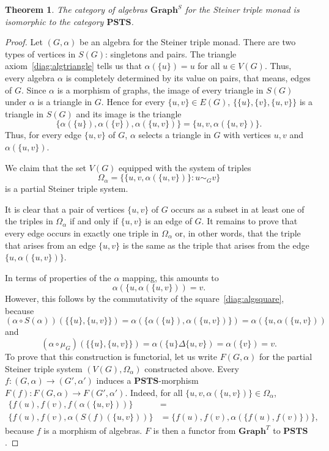 \documentclass[reqno,A4paper]{amsart}
\newcommand{\PSTS}{\mathbf{PSTS}}
\newcommand{\Graph}{\mathbf{Graph}}
\newtheorem{theorem}{Theorem}[section]
\theoremstyle{definition}
\numberwithin{equation}{section}
\begin{document}
\begin{theorem}
The category of algebras $\Graph^S$ for the Steiner triple monad is isomorphic to the category
$\PSTS$.
\end{theorem}
\begin{proof}
Let $(G,\alpha)$ be an algebra for the Steiner triple monad. 
There are two types of vertices in $S(G)$: singletons and pairs. The triangle
axiom~\eqref{diag:algtriangle} tells us that $\alpha(\{u\})=u$ for all $u\in V(G)$.
Thus, every algebra $\alpha$ is completely determined by its value on pairs, that means, edges of $G$.
Since $\alpha$ is a morphism of graphs, the image of every triangle in $S(G)$ under $\alpha$ is a triangle
in $G$. Hence for every $\{u,v\}\in E(G)$, $\{\{u\},\{v\},\{u,v\}\}$ is a triangle in
$S(G)$ and its image is the triangle
$$
\{\alpha(\{u\}),\alpha(\{v\}),\alpha(\{u,v\})\}=\{u,v,\alpha(\{u,v\})\}.
$$
Thus, for every edge $\{u,v\}$ of $G$, $\alpha$ selects a triangle in $G$ with vertices
$u,v$ and $\alpha(\{u,v\})$. 

We claim that the set $V(G)$ equipped with the system of triples
$$
\Omega_\alpha=\bigl\{\{u,v,\alpha(\{u,v\})\}:u\sim_G v\bigr\}
$$
is a partial Steiner triple system. 

It is clear that a pair of vertices $\{u,v\}$ of $G$ occurs as a subset in at least one
of the triples in $\Omega_\alpha$ if and only if $\{u,v\}$ is an edge of
$G$. It remains to prove that every edge occurs in exactly one triple in
$\Omega_\alpha$ or, in other words, that the triple that arises from an edge
$\{u,v\}$ is the same as the triple that arises from the edge
$\{u,\alpha(\{u,v\})\}$.

In terms of properties of the $\alpha$ mapping, this amounts to
$$
\alpha(\{u,\alpha(\{u,v\}))=v.
$$
However, this follows by the commutativity of the square~\eqref{diag:algsquare}, because
$$
(\alpha\circ S(\alpha))(\{\{u\},\{u,v\}\})=\alpha(\{\alpha(\{u\}),\alpha(\{u,v\})\})=\alpha(\{u,\alpha(\{u,v\}))
$$
and
$$
(\alpha\circ\mu_G)(\{\{u\},\{u,v\}\})=\alpha(\{u\}\Delta\{u,v\})=\alpha(\{v\})=v.
$$
To prove that this construction is functorial,
let us write $F(G,\alpha)$ for the partial Steiner triple system $(V(G),\Omega_\alpha)$
constructed above.
Every $f:(G,\alpha)\to (G',\alpha')$ induces a $\PSTS$-morphism $F(f):F(G,\alpha)\to F(G',\alpha')$.
Indeed, for all $\{u,v,\alpha(\{u,v\})\}\in\Omega_\alpha$,
\begin{align*}
\{f(u),f(v),f(\alpha(\{u,v\}))\}&=\\
\{f(u),f(v),\alpha(S(f)(\{u,v\}))\}&=
\{f(u),f(v),\alpha(\{f(u),f(v)\})\},
\end{align*}
because $f$ is a morphism of algebras. $F$ is then a functor from $\Graph^T$ to $\PSTS$. 


\end{proof}
\end{document}
